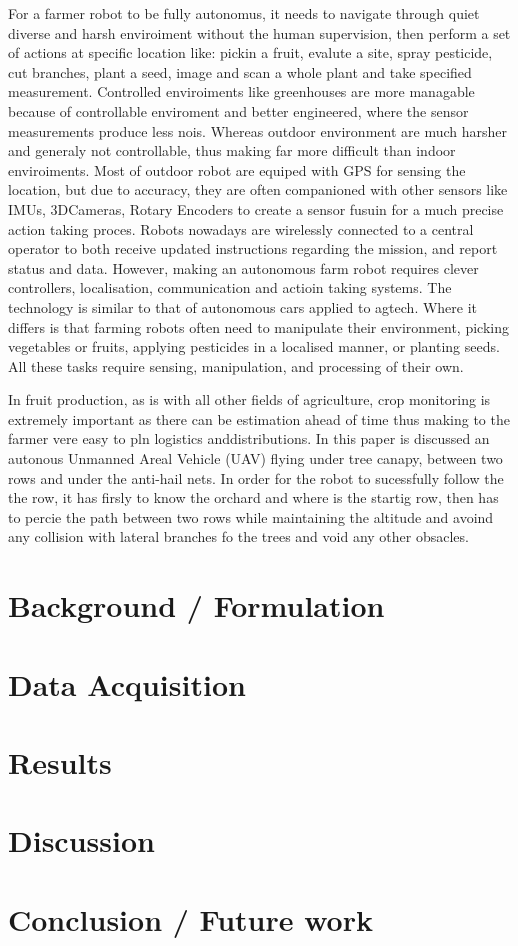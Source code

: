 \documentclass[10pt,jaurnal,compsoc]{IEEEtran}
\begin{document}
For a farmer robot to be fully autonomus, it needs to navigate through quiet diverse and harsh enviroiment without the human supervision, then perform a set of actions at specific location like: pickin a fruit, evalute a site, spray pesticide, cut branches, plant a seed, image and scan a whole plant and take specified measurement. Controlled enviroiments like greenhouses are more managable because of controllable enviroment and better engineered, where the sensor measurements produce less nois. Whereas outdoor environment are much harsher and generaly not controllable, thus making far more difficult than indoor enviroiments. Most of outdoor robot are equiped with GPS for sensing the location, but due to accuracy, they are often companioned with other sensors like IMUs, 3DCameras, Rotary Encoders to create a sensor fusuin for a much precise action taking proces. Robots nowadays are wirelessly connected to a central operator to both receive updated instructions regarding the mission, and report status and data. However, making an autonomous farm robot requires clever controllers, localisation, communication and actioin taking systems. The technology is similar to that of autonomous cars applied to agtech. Where it differs is that farming robots often need to manipulate their environment, picking vegetables or fruits, applying pesticides in a localised manner, or planting seeds. All these tasks require sensing, manipulation, and processing of their own.

In fruit production, as is with all other fields of agriculture, crop monitoring is extremely important as there can be estimation ahead of time thus making to the farmer vere easy to pln logistics anddistributions. In this paper is discussed an autonous Unmanned Areal Vehicle (UAV) flying under tree canapy, between two rows and under the anti-hail nets. In order for the robot to sucessfully follow the the row, it has firsly to know the orchard and where is the startig row, then has to percie the path between two rows while maintaining the altitude and avoind any collision with lateral branches fo the trees and void any other obsacles. 

\section{Background / Formulation}

\section{Data Acquisition}

\section{Results}

\section{Discussion}

\section{Conclusion / Future work}



\end{document}
